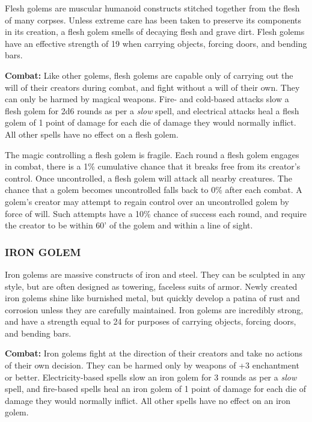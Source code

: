 \begin{multicols}{2}
Flesh golems are muscular humanoid constructs stitched together from the flesh of many corpses. Unless extreme care has been taken to preserve its components in its creation, a flesh golem smells of decaying flesh and grave dirt. Flesh golems have an effective strength of 19 when carrying objects, forcing doors, and bending bars.

\textbf{Combat:} Like other golems, flesh golems are capable only of carrying out the will of their creators during combat, and fight without a will of their own. They can only be harmed by magical weapons. Fire- and cold-based attacks slow a flesh golem for 2d6 rounds as per a \textit{slow} spell, and electrical attacks heal a flesh golem of 1 point of damage for each die of damage they would normally inflict. All other spells have no effect on a flesh golem.

The magic controlling a flesh golem is fragile. Each round a flesh golem engages in combat, there is a 1\% cumulative chance that it breaks free from its creator's control. Once uncontrolled, a flesh golem will attack all nearby creatures. The chance that a golem becomes uncontrolled falls back to 0\% after each combat. A golem's creator may attempt to regain control over an uncontrolled golem by force of will. Such attempts have a 10\% chance of success each round, and require the creator to be within 60' of the golem and within a line of sight.

\subsubsection{IRON GOLEM}

Iron golems are massive constructs of iron and steel. They can be sculpted in any style, but are often designed as towering, faceless suits of armor. Newly created iron golems shine like burnished metal, but quickly develop a patina of rust and corrosion unless they are carefully maintained. Iron golems are incredibly strong, and have a strength equal to 24 for purposes of carrying objects, forcing doors, and bending bars.

\textbf{Combat:} Iron golems fight at the direction of their creators and take no actions of their own decision. They can be harmed only by weapons of +3 enchantment or better. Electricity-based spells slow an iron golem for 3 rounds as per a \textit{slow} spell, and fire-based spells heal an iron golem of 1 point of damage for each die of damage they would normally inflict. All other spells have no effect on an iron golem.


\end{multicols}
